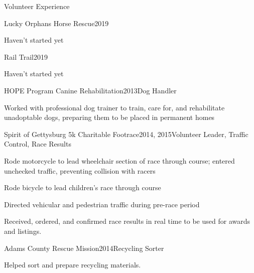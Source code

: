 \documentclass{resume} %
\begin{document}
\begin{rSection}{Volunteer Experience}


\begin{rWorkSubsection}{Lucky Orphans Horse Rescue}{2019}{}{}
\item Haven't started yet
\end{rWorkSubsection}


\begin{rWorkSubsection}{Rail Trail}{2019}{}{}
\item Haven't started yet
\end{rWorkSubsection}


\begin{rWorkSubsection}{HOPE Program Canine Rehabilitation}{2013}{Dog Handler}{}
\item Worked with professional dog trainer to train, care for, and rehabilitate unadoptable dogs, preparing them to be placed in permanent homes
\end{rWorkSubsection}


\begin{rWorkSubsection}{Spirit of Gettysburg 5k Charitable Footrace}{2014, 2015}{Volunteer Leader, Traffic Control, Race Results}{}
\item Rode motorcycle to lead wheelchair section of race through course; entered unchecked traffic, preventing collision with racers
\item Rode bicycle to lead children's race through course
\item Directed vehicular and pedestrian traffic during pre-race period
\item Received, ordered, and confirmed race results in real time to be used for awards and listings.
\end{rWorkSubsection}


\begin{rWorkSubsection}{Adams County Rescue Mission}{2014}{Recycling Sorter}{}
\item Helped sort and prepare recycling materials.
\end{rWorkSubsection}


\end{rSection}
\end{document}
